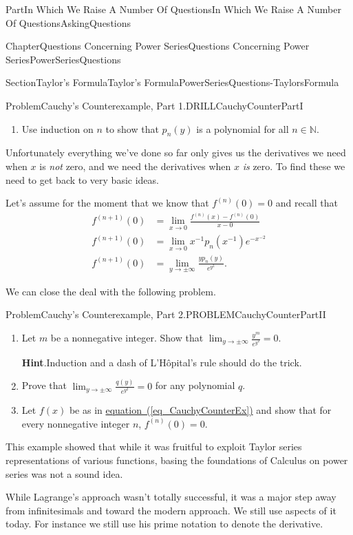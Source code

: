 \documentclass[oneside,10pt,]{book}
\newcommand{\blocktitlefont}{\relax}
\newcommand{\xreffont}{\relax}
\numberwithin{equation}{part}
\def\limit#1#2#3{{\displaystyle\lim_{#1\rightarrow #2}#3}}
\newcommand{\NN}{\mathbb {N}}
\newcommand{\amp}{&}
\begin{document}
\begin{partptx}{Part}{In Which We Raise A Number Of Questions}{}{In Which We Raise A Number Of Questions}{}{}{AskingQuestions}
\begin{chapterptx}{Chapter}{Questions Concerning Power Series}{}{Questions Concerning Power Series}{}{}{PowerSeriesQuestions}
\begin{sectionptx}{Section}{Taylor's Formula}{}{Taylor's Formula}{}{}{PowerSeriesQuestions-TaylorsFormula}
\begin{problem}{Problem}{Cauchy's Counterexample, Part 1.}{DRILLCauchyCounterPartI}
\begin{enumerate}[font=\bfseries,label=(\alph*),ref=\alph*]
\item{}Use induction on \(n\) to show that \(p_n(y)\) is a polynomial for all \(n\in\NN\).%
\end{enumerate}%
\end{problem}
Unfortunately everything we've done so far only gives us the derivatives we need when \(x\) is \emph{not} zero, and we need the derivatives when \(x\) \emph{is} zero. To find these we need to get back to very basic ideas.%
\par
Let's assume for the moment that we know that \(f^{(n)}(0)=0\) and recall that%
\begin{align*}
f^{(n+1)}(0) \amp = \limit{x}{0}{\frac{f^{(n)}(x)-f^{(n)}(0)}{x-0}}\\
f^{(n+1)}(0) \amp = \limit{x}{0}{x^{-1}p_n(x^{-1})e^{-x^{-2}}}\\
f^{(n+1)}(0) \amp = \limit{y}{\pm\infty}{\frac{yp_n(y)}{e^{y^2}}}\text{.}
\end{align*}
%
\par
We can close the deal with the following problem.%
\begin{problem}{Problem}{Cauchy's Counterexample, Part 2.}{PROBLEMCauchyCounterPartII}%
\begin{enumerate}[font=\bfseries,label=(\alph*),ref=\alph*]%
\item{}Let \(m\) be a nonnegative integer. Show that \(\limit{y}{\pm\infty}{\frac{y^m}{e^{y^2}}}=0\).%
\par\smallskip%
\noindent\textbf{\blocktitlefont Hint}.\hypertarget{PROBLEMCauchyCounterPartII-3-2}{}\quad{}Induction and a dash of L'Hôpital's rule should do the trick.%
\item{}Prove that \(\limit{y}{\pm\infty}{\frac{q(y)}{e^{y^2}}}=0\) for any polynomial \(q\).%
\item{}Let \(f(x)\) be as in \hyperref[eq_CauchyCounterEx]{equation~({\xreffont\ref{eq_CauchyCounterEx}})} and show that for every nonnegative integer \(n\), \(f^{(n)}(0)=0\).%
\end{enumerate}%
\end{problem}
This example showed that while it was fruitful to exploit Taylor series representations of various functions, basing the foundations of Calculus on power series was not a sound idea.%
\par
While Lagrange's approach wasn't totally successful, it was a major step away from infinitesimals and toward the modern approach.  We still use aspects of it today.  For instance we still use his prime notation to denote the derivative.%
\par

\end{sectionptx}
\end{chapterptx}
\end{partptx}
\end{document}
